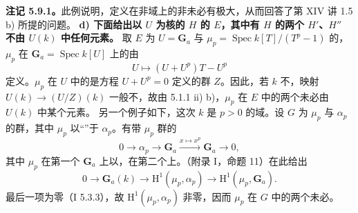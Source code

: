 \textbf{注记 5.9.1。}此例说明，定义在非域上的非未必有极大，从而回答了第 XIV 讲 1.5 b) 所提的问题。
\textbf{d) 下面给出以 $U$ 为核的 $H$ 的 $E$，其中有 $H$ 的两个 $H'$、$H''$ 不由 $U(k)$ 中任何元素。}
取 $E$ 为 $U=\mathbf G_a$ 与 $\mu_p=\operatorname{Spec}k[T]/(T^p-1)$ 的，$\mu_p$ 在 $\mathbf G_a=\operatorname{Spec}k[U]$ 上的由
\[U\longmapsto(U+U^p)T-U^p\]
定义。$\mu_p$ 在 $U$ 中的是方程 $U+U^p=0$ 定义的群 $Z$。因此，若 $k$ 不，映射 $U(k)\to(U/Z)(k)$ 一般不，故由 5.1.1 ii) b)，$\mu_p$ 在 $E$ 中的两个未必由 $U(k)$ 中某个元素。
另一个例子如下，这次 $k$ 是 $p>0$ 的域。设 $G$ 为 $\mu_p$ 与 $\alpha_p$ 的群，其中 $\mu_p$ 以“”于 $\alpha_p$。有带 $\mu_p$ 群的
\[0\longrightarrow\alpha_p\longrightarrow\mathbf G_a\xrightarrow{x\mapsto x^p}\mathbf G_a\longrightarrow0,\]
其中 $\mu_p$ 在第一个 $\mathbf G_a$ 上以，在第二个上。（附录 I，命题 11）在此给出
\[0\longrightarrow\mathbf G_a(k)\longrightarrow\mathrm H^1(\mu_p,\alpha_p)\longrightarrow\mathrm H^1(\mu_p,\mathbf G_a).\]
最后一项为零（I 5.3.3），故 $\mathrm H^1(\mu_p,\alpha_p)$ 非零，因而 $\mu_p$ 在 $G$ 中的两个未必。

